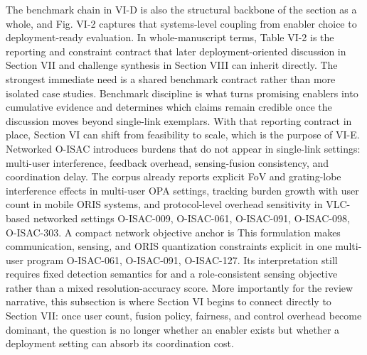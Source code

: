 {}The benchmark chain in VI-D is also the structural backbone of the section as a whole, and Fig. VI-2 captures that systems-level coupling from enabler choice to deployment-ready evaluation. In whole-manuscript terms, Table VI-2 is the reporting and constraint contract that later deployment-oriented discussion in Section VII and challenge synthesis in Section VIII can inherit directly.\markdownRendererParagraphSeparator
{}\markdownRendererParagraphSeparator
{} The strongest immediate need is a shared benchmark contract rather than more isolated case studies. Benchmark discipline is what turns promising enablers into cumulative evidence and determines which claims remain credible once the discussion moves beyond single-link exemplars. With that reporting contract in place, Section VI can shift from feasibility to scale, which is the purpose of VI-E.\markdownRendererInterblockSeparator
{}
\markdownRendererSectionEnd \markdownRendererSectionBegin
{}\markdownRendererInterblockSeparator
{}Networked O-ISAC introduces burdens that do not appear in single-link settings: multi-user interference, feedback overhead, sensing-fusion consistency, and coordination delay. The corpus already reports explicit FoV and grating-lobe interference effects in multi-user OPA settings, tracking burden growth with user count in mobile ORIS systems, and protocol-level overhead sensitivity in VLC-based networked settings O-ISAC-009, O-ISAC-061, O-ISAC-091, O-ISAC-098, O-ISAC-303.\markdownRendererParagraphSeparator
{}A compact network objective anchor is\markdownRendererParagraphSeparator
{}\markdownRendererSoftLineBreak
{}\markdownRendererParagraphSeparator
{}This formulation makes communication, sensing, and ORIS quantization constraints explicit in one multi-user program O-ISAC-061, O-ISAC-091, O-ISAC-127. Its interpretation still requires fixed detection semantics for  and a role-consistent sensing objective rather than a mixed resolution-accuracy score. More importantly for the review narrative, this subsection is where Section VI begins to connect directly to Section VII: once user count, fusion policy, fairness, and control overhead become dominant, the question is no longer whether an enabler exists but whether a deployment setting can absorb its coordination cost.\markdownRendererParagraphSeparator
